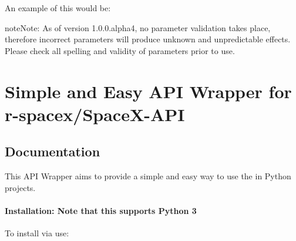 \documentclass[letterpaper,10pt,english]{sphinxmanual}
\begin{document}
An example of this would be:

\begin{sphinxVerbatim}[commandchars=\\\{\}]
       
                                      
  
\end{sphinxVerbatim}

\begin{sphinxadmonition}{note}{Note:}
As of version 1.0.0.alpha4, no parameter validation takes place, therefore incorrect parameters will produce
unknown and unpredictable effects. Please check all spelling and validity of parameters prior to use.
\end{sphinxadmonition}


\chapter{Simple and Easy API Wrapper for r-spacex/SpaceX-API}
\label{\detokenize{index:simple-and-easy-api-wrapper-for-r-spacex-spacex-api}}

\section{Documentation}
\label{\detokenize{index:documentation}}
This API Wrapper aims to provide a simple and easy
way to use the  in Python projects.
\subsubsection*{Installation: Note that this supports Python 3 }

To install via  use: 
\end{document}
